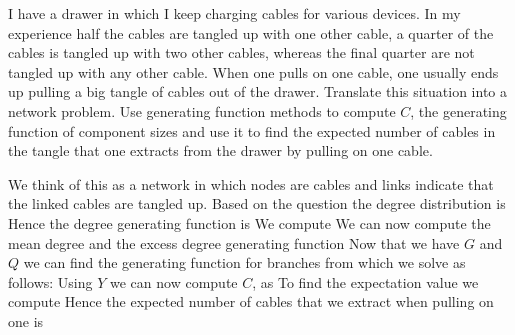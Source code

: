 I have a drawer in which I keep charging cables for various devices. 
In my experience half the cables are tangled up with one other cable, 
a quarter of the cables is tangled up with two other cables, whereas the final quarter are not tangled up with any other cable. When one pulls on one cable, one usually ends up pulling a big tangle of cables out of the drawer. Translate this situation into a network problem. Use generating function methods to compute $C$, the generating function of component sizes and use it to find the expected number of cables in the tangle that one extracts from the drawer by pulling on one cable. 

\solution
We think of this as a network in which nodes are cables and links indicate that the linked cables are tangled up. Based on the question the degree distribution is 
Hence the degree generating function is 
We compute 
We can now compute the mean degree 
and the excess degree generating function 
Now that we have $G$ and $Q$ we can find the generating function for branches from
which we solve as follows:
Using $Y$ we can now compute $C$, as 
To find the expectation value we compute
Hence the expected number of cables that we extract when pulling 
on one is 
